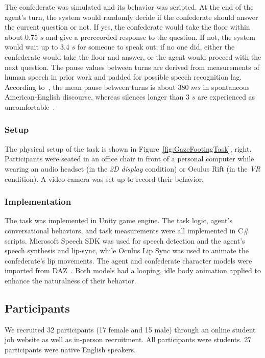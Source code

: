 The confederate was simulated and its behavior was scripted. At the end of the agent's turn, the system would randomly decide if the confederate should answer the current question or not. If yes, the confederate would take the floor within about 0.75 $s$ and give a prerecorded response to the question. If not, the system would wait up to 3.4 $s$ for someone to speak out; if no one did, either the confederate would take the floor and answer, or the agent would proceed with the next question. The pause values between turns are derived from measurements of human speech in prior work and padded for possible speech recognition lag. According to~\citet{weilhammer2003durational}, the mean pause between turns is about 380 $ms$ in spontaneous American-English discourse, whereas silences longer than 3 $s$ are experienced as uncomfortable~\citep{mclaughlin1982awkward}.

\subsubsection{Setup}

The physical setup of the task is shown in Figure~\ref{fig:GazeFootingTask}, right. Participants were seated in an office chair in front of a personal computer while wearing an audio headset (in the \emph{2D display} condition) or Oculus Rift (in the \emph{VR} condition). A video camera was set up to record their behavior.

\subsubsection{Implementation}

The task was implemented in Unity game engine. The task logic, agent's conversational behaviors, and task measurements were all implemented in C\# scripts. Microsoft Speech SDK was used for speech detection and the agent's speech synthesis and lip-sync, while Oculus Lip Sync was used to animate the confederate's lip movements. The agent and confederate character models were imported from DAZ~\citep{daz3d}. Both models had a looping, idle body animation applied to enhance the naturalness of their behavior.

\subsection{Participants}

We recruited 32 participants (17 female and 15 male) through an online student job website as well as in-person recruitment. All participants were students. 27 participants were native English speakers.

